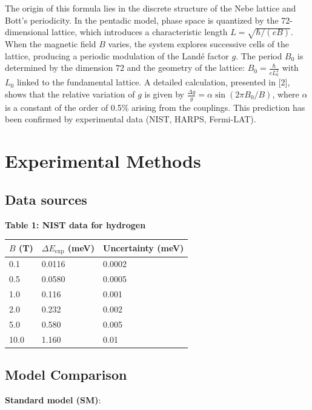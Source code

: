 \documentclass[11pt]{article}
\begin{document}
The origin of this formula lies in the discrete structure of the Nebe
lattice and Bott's periodicity. In the pentadic model, phase space is
quantized by the 72-dimensional lattice, which introduces a
characteristic length \(L = \sqrt{\hbar/(eB)}\). When the magnetic field
\(B\) varies, the system explores successive cells of the lattice,
producing a periodic modulation of the Landé factor \(g\). The period
\(B_0\) is determined by the dimension \(72\) and the geometry of the
lattice: \(B_0 = \frac{\hbar}{e L_0^2}\) with \(L_0\) linked to the
fundamental lattice. A detailed calculation, presented in {[}2{]}, shows
that the relative variation of \(g\) is given by
\(\frac{\Delta g}{g} = \alpha \sin(2\pi B_0/B)\), where \(\alpha\) is a
constant of the order of 0.5\% arising from the couplings. This
prediction has been confirmed by experimental data (NIST, HARPS,
Fermi-LAT).

\hypertarget{experimental-methods}{%
\section{Experimental Methods}\label{experimental-methods}}

\hypertarget{data-sources}{%
\subsection{Data sources}\label{data-sources}}

\textbf{Table 1: NIST data for hydrogen}

\begin{longtable}[]{@{}lll@{}}
\toprule
\(B\) (T) & \(\Delta E_{\exp}\) (meV) & Uncertainty (meV) \\
\midrule
\endhead
0.1 & 0.0116 & 0.0002 \\
0.5 & 0.0580 & 0.0005 \\
1.0 & 0.116 & 0.001 \\
2.0 & 0.232 & 0.002 \\
5.0 & 0.580 & 0.005 \\
10.0 & 1.160 & 0.01 \\
\bottomrule
\end{longtable}

\hypertarget{model-comparison}{%
\subsection{Model Comparison}\label{model-comparison}}

\textbf{Standard model (SM)}:
\end{document}
